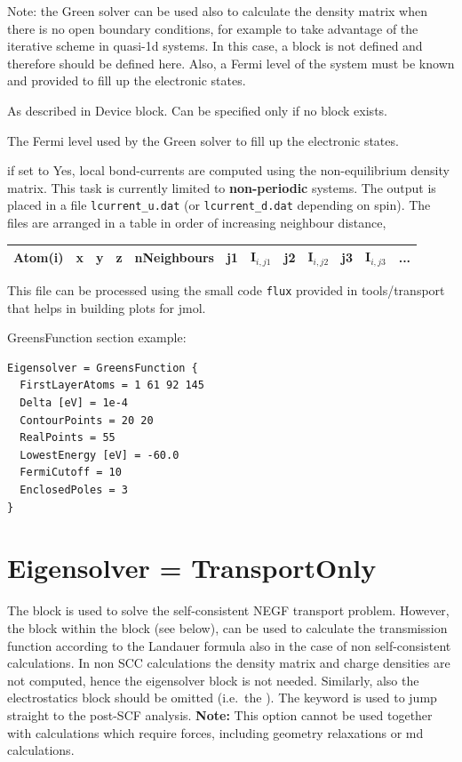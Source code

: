 \begin{description}
Note: the Green solver can be used also to calculate the density matrix when
there is no open boundary conditions, for example to take advantage of the
iterative scheme in quasi-1d systems. In this case, a  block is
not defined and therefore  should be defined here. Also, a
Fermi level of the system must be known and provided to fill up the electronic
states.

\item[\is{FirstLayerAtoms}] As described in Device block. Can be specified only
  if no  block exists.

\item[\is{FermiLevel}] The Fermi level used by the Green
  solver to fill up the electronic states.

\item[\is{LocalCurrents}] if set to Yes, local bond-currents are computed using
  the non-equilibrium density matrix.  This task is currently limited to
  \textbf{non-periodic} systems. The output is placed in a file
  \verb|lcurrent_u.dat| (or \verb|lcurrent_d.dat| depending on spin).  The files
  are arranged in a table in order of increasing neighbour distance,

\begin{tabular}{|c|c|c|c|c|c|c|c|c|c|c|c|}
  \hline
  Atom(i) & x & y & z &  nNeighbours &  j1 & I$_{i,j1}$ & j2 & I$_{i,j2}$ &  j3 & I$_{i,j3}$ & ...\\
  \hline
\end{tabular}

  This file can be processed using the small code \verb|flux| provided in
  tools/transport that helps in building plots for jmol.
\end{description}

GreensFunction section example:

\begin{verbatim}
Eigensolver = GreensFunction {
  FirstLayerAtoms = 1 61 92 145
  Delta [eV] = 1e-4
  ContourPoints = 20 20
  RealPoints = 55
  LowestEnergy [eV] = -60.0
  FermiCutoff = 10
  EnclosedPoles = 3
}
\end{verbatim}


\section{Eigensolver = TransportOnly} 
The  block is used to solve the self-consistent NEGF
transport problem. However, the block  within the
 block (see below), can be used to calculate the transmission
function according to the Landauer formula also in the case of non
self-consistent calculations.  In non SCC calculations the density matrix and
charge densities are not computed, hence the eigensolver block is not
needed. Similarly, also the electrostatics block should be omitted (i.e.\ the
).  The keyword  is
used to jump straight to the post-SCF analysis.  \textbf{Note:} This option
cannot be used together with calculations which require forces, including
geometry relaxations or md calculations.



